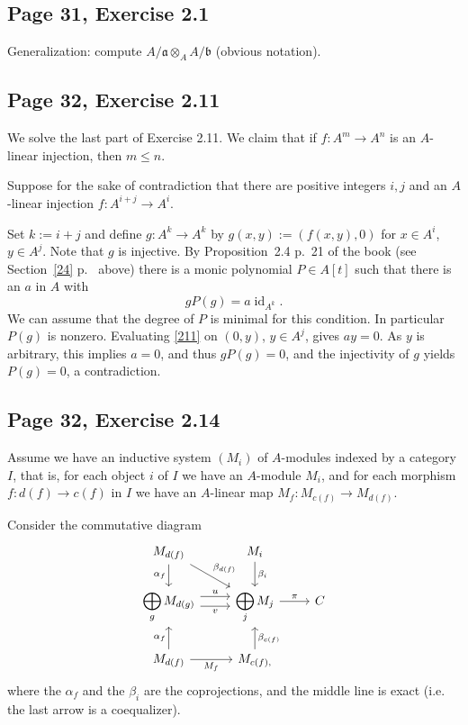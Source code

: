 \documentclass[parskip=half,fontsize=12pt]{scrartcl}%
\newcommand{\oo}{\operatorname}\newcommand{\ooo}{\operatorname*}
\newcommand{\mf}{\mathfrak}
\newcommand{\aaa}{\mf a}
\newcommand{\bbb}{\mf b}
\newcommand{\ds}{\displaystyle}
\begin{document}
\subsection{Page 31, Exercise 2.1}%

Generalization: compute $A/\aaa\otimes_AA/\bbb$ (obvious notation).

\subsection{Page 32, Exercise 2.11}%

We solve the last part of Exercise 2.11. We claim that if $f:A^m\to A^n$ is an $A$-linear injection, then $m\le n$. 

Suppose for the sake of contradiction that there are positive integers $i,j$ and an $A$-linear injection $f:A^{i+j}\to A^i$. 

Set $k:=i+j$ and define $g:A^k\to A^k$ by $g(x,y):=(f(x,y),0)$ for $x\in A^i$, $y\in A^j$. Note that $g$ is injective. By Proposition~2.4 p.~21 of the book (see Section~\ref{24} p.~\pageref{24} above) there is a monic polynomial $P\in A[t]$ such that there is an $a$ in $A$ with 
\begin{equation}\label{211}
gP(g)=a\oo{id}_{A^k}.
\end{equation} 
We can assume that the degree of $P$ is minimal for this condition. In particular $P(g)$ is nonzero. Evaluating \eqref{211} on $(0,y)$, $y\in A^j$, gives $ay=0$. As $y$ is arbitrary, this implies $a=0$, and thus $gP(g)=0$, and the injectivity of $g$ yields $P(g)=0$, a contradiction. 

\subsection{Page 32, Exercise 2.14}\label{colim}%

Assume we have an inductive system $(M_i)$ of $A$-modules indexed by a category  $I$, that is, for each object $i$ of $I$ we have an $A$-module $M_i$, and for each morphism $f:d(f)\to c(f)$ in $I$ we have an $A$-linear map $M_f:M_{c(f)}\to M_{d(f)}$. 

Consider the commutative diagram %
$$
\begin{tikzcd}
M_{d(f)}\ar[d,"\alpha_{f}"']\ar[dr,"\beta_{d(f)}"]&M_i\ar[d,"\beta_i"]\\ 
\ds\bigoplus_gM_{d(g)}\ar[r,yshift=0.9ex,"u"]\ar[r,yshift=-0.9ex,"v"']&\ds\bigoplus_jM_j\ar[r,"\pi"]&C\\ 
M_{d(f)}\ar[u,"\alpha_{f}"]\ar[r,"M_f"']&M_{c(f),}\ar[u,"\beta_{c(f)}"']
\end{tikzcd}
$$ 
where the $\alpha_f$ and the $\beta_i$ are the coprojections, and the middle line is exact (i.e. the last arrow is a coequalizer). 
\end{document}
